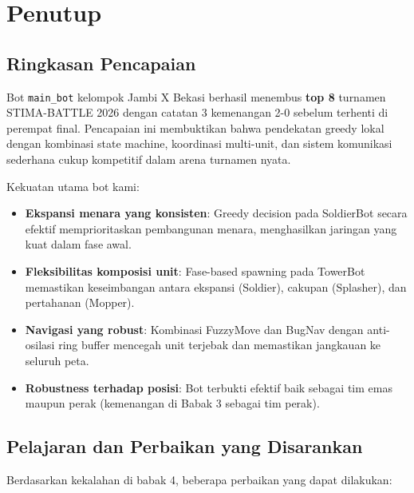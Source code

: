 \documentclass[12pt, a4paper]{article}
\begin{document}
\section{Penutup}

\subsection{Ringkasan Pencapaian}

Bot \texttt{main\_bot} kelompok Jambi X Bekasi berhasil menembus \textbf{top 8}
turnamen STIMA-BATTLE 2026 dengan catatan 3 kemenangan 2-0 sebelum terhenti di
perempat final. Pencapaian ini membuktikan bahwa pendekatan greedy lokal dengan
kombinasi state machine, koordinasi multi-unit, dan sistem komunikasi sederhana
cukup kompetitif dalam arena turnamen nyata.

Kekuatan utama bot kami:
\begin{itemize}
    \item \textbf{Ekspansi menara yang konsisten}: Greedy decision pada SoldierBot
          secara efektif memprioritaskan pembangunan menara, menghasilkan jaringan
          yang kuat dalam fase awal.
    \item \textbf{Fleksibilitas komposisi unit}: Fase-based spawning pada TowerBot
          memastikan keseimbangan antara ekspansi (Soldier), cakupan (Splasher), dan
          pertahanan (Mopper).
    \item \textbf{Navigasi yang robust}: Kombinasi FuzzyMove dan BugNav dengan
          anti-osilasi ring buffer mencegah unit terjebak dan memastikan jangkauan
          ke seluruh peta.
    \item \textbf{Robustness terhadap posisi}: Bot terbukti efektif baik sebagai
          tim emas maupun perak (kemenangan di Babak 3 sebagai tim perak).
\end{itemize}

\subsection{Pelajaran dan Perbaikan yang Disarankan}

Berdasarkan kekalahan di babak 4, beberapa perbaikan yang dapat dilakukan:
\end{document}
